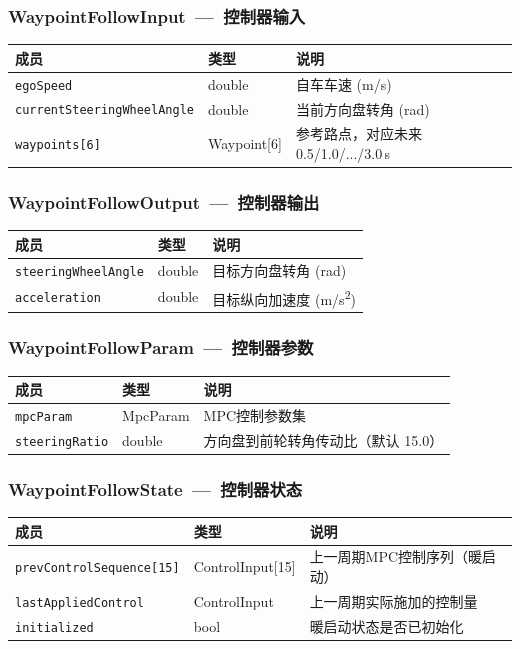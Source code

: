 \documentclass[a4paper,10pt]{article}
\begin{document}
\subsubsection{WaypointFollowInput~---~控制器输入}
\begin{longtable}{|L{4.5cm}|C{2.5cm}|L{8cm}|}
\hline
\textbf{成员} & \textbf{类型} & \textbf{说明} \\
\hline
\texttt{egoSpeed} & double & 自车车速 (m/s) \\
\hline
\texttt{currentSteeringWheelAngle} & double & 当前方向盘转角 (rad) \\
\hline
\texttt{waypoints[6]} & Waypoint[6] & 参考路点，对应未来 0.5/1.0/.../3.0\,s \\
\hline
\end{longtable}

\subsubsection{WaypointFollowOutput~---~控制器输出}
\begin{longtable}{|L{4.5cm}|C{2.5cm}|L{8cm}|}
\hline
\textbf{成员} & \textbf{类型} & \textbf{说明} \\
\hline
\texttt{steeringWheelAngle} & double & 目标方向盘转角 (rad) \\
\hline
\texttt{acceleration} & double & 目标纵向加速度 (m/s\textsuperscript{2}) \\
\hline
\end{longtable}

\subsubsection{WaypointFollowParam~---~控制器参数}
\begin{longtable}{|L{4.5cm}|C{2.5cm}|L{8cm}|}
\hline
\textbf{成员} & \textbf{类型} & \textbf{说明} \\
\hline
\texttt{mpcParam} & MpcParam & MPC控制参数集 \\
\hline
\texttt{steeringRatio} & double & 方向盘到前轮转角传动比（默认 15.0） \\
\hline
\end{longtable}

\subsubsection{WaypointFollowState~---~控制器状态}
\begin{longtable}{|L{4.5cm}|C{2.8cm}|L{7.7cm}|}
\hline
\textbf{成员} & \textbf{类型} & \textbf{说明} \\
\hline
\texttt{prevControlSequence[15]} & ControlInput[15] & 上一周期MPC控制序列（暖启动） \\
\hline
\texttt{lastAppliedControl} & ControlInput & 上一周期实际施加的控制量 \\
\hline
\texttt{initialized} & bool & 暖启动状态是否已初始化 \\
\hline
\end{longtable}
\end{document}
